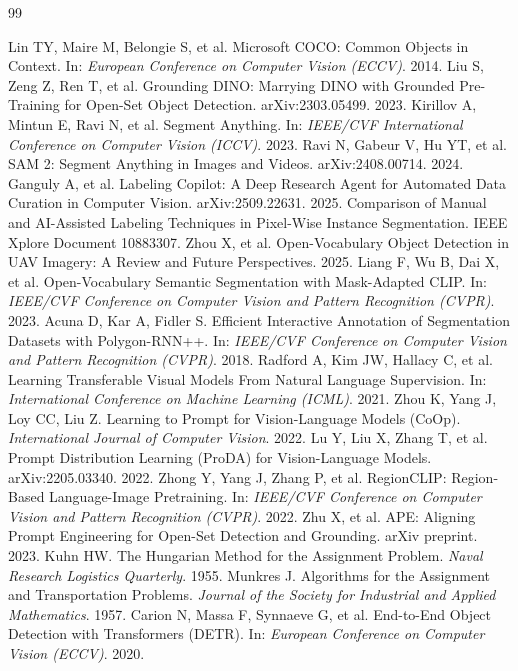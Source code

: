 \documentclass[pdflatex,sn-mathphys-num]{sn-jnl}
\begin{document}
\begin{thebibliography}{99}

 Lin TY, Maire M, Belongie S, et al. Microsoft COCO: Common Objects in Context. In: \emph{European Conference on Computer Vision (ECCV)}. 2014.
 Liu S, Zeng Z, Ren T, et al. Grounding DINO: Marrying DINO with Grounded Pre-Training for Open-Set Object Detection. arXiv:2303.05499. 2023.
 Kirillov A, Mintun E, Ravi N, et al. Segment Anything. In: \emph{IEEE/CVF International Conference on Computer Vision (ICCV)}. 2023.
 Ravi N, Gabeur V, Hu YT, et al. SAM 2: Segment Anything in Images and Videos. arXiv:2408.00714. 2024.
 Ganguly A, et al. Labeling Copilot: A Deep Research Agent for Automated Data Curation in Computer Vision. arXiv:2509.22631. 2025.
 Comparison of Manual and AI-Assisted Labeling Techniques in Pixel-Wise Instance Segmentation. IEEE Xplore Document 10883307.
 Zhou X, et al. Open-Vocabulary Object Detection in UAV Imagery: A Review and Future Perspectives. 2025.
 Liang F, Wu B, Dai X, et al. Open-Vocabulary Semantic Segmentation with Mask-Adapted CLIP. In: \emph{IEEE/CVF Conference on Computer Vision and Pattern Recognition (CVPR)}. 2023.
 Acuna D, Kar A, Fidler S. Efficient Interactive Annotation of Segmentation Datasets with Polygon-RNN++. In: \emph{IEEE/CVF Conference on Computer Vision and Pattern Recognition (CVPR)}. 2018.
 Radford A, Kim JW, Hallacy C, et al. Learning Transferable Visual Models From Natural Language Supervision. In: \emph{International Conference on Machine Learning (ICML)}. 2021.
 Zhou K, Yang J, Loy CC, Liu Z. Learning to Prompt for Vision-Language Models (CoOp). \emph{International Journal of Computer Vision}. 2022.
 Lu Y, Liu X, Zhang T, et al. Prompt Distribution Learning (ProDA) for Vision-Language Models. arXiv:2205.03340. 2022.
 Zhong Y, Yang J, Zhang P, et al. RegionCLIP: Region-Based Language-Image Pretraining. In: \emph{IEEE/CVF Conference on Computer Vision and Pattern Recognition (CVPR)}. 2022.
 Zhu X, et al. APE: Aligning Prompt Engineering for Open-Set Detection and Grounding. arXiv preprint. 2023.
 Kuhn HW. The Hungarian Method for the Assignment Problem. \emph{Naval Research Logistics Quarterly}. 1955.
 Munkres J. Algorithms for the Assignment and Transportation Problems. \emph{Journal of the Society for Industrial and Applied Mathematics}. 1957.
 Carion N, Massa F, Synnaeve G, et al. End-to-End Object Detection with Transformers (DETR). In: \emph{European Conference on Computer Vision (ECCV)}. 2020.

\end{thebibliography}
\end{document}
